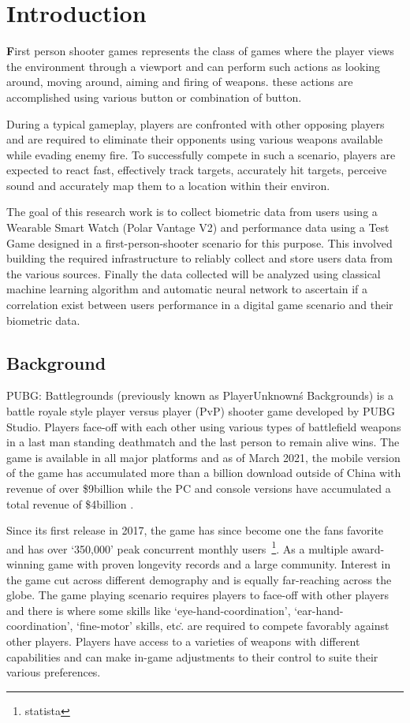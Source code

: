 \chapter{Introduction}

\textbf{F}irst person shooter games represents the class of games where the  player views the environment through a viewport
and can perform such actions as looking around, moving around, aiming and firing of weapons. these actions are accomplished
using various button or combination of button.

During a typical gameplay, players are confronted with other opposing players and are required to eliminate their opponents
using various weapons available while evading enemy fire. To successfully compete in such a scenario, players are expected to
react fast, effectively track targets, accurately hit targets, perceive sound and accurately map them to a location within
their environ.

The goal of this research work is to collect biometric data from users using a Wearable Smart Watch (Polar Vantage V2)
and performance data using a Test Game designed in a first-person-shooter scenario for this purpose. This involved building
the required infrastructure to reliably collect and store users data from the various sources. Finally the data collected will be
analyzed using classical machine learning algorithm and automatic neural network to ascertain if a correlation exist between
users performance in a digital game scenario and their biometric data.


\section{Background}
PUBG: Battlegrounds (previously known as PlayerUnknown\'s Backgrounds) is a battle royale style player versus
player (PvP) shooter game developed by PUBG Studio. Players face-off with each other using various types of battlefield weapons
in a last man standing deathmatch and the last person to remain alive wins. The game is available in all major platforms
and as of March 2021, the mobile version of the game has accumulated more than a billion download outside of China with
revenue of over \$9billion while the PC and console versions have accumulated a total revenue of \$4billion
\cite{statista}.
\par
Since its first release in 2017, the game has since become one the fans favorite and has over `350,000' peak concurrent
monthly users~\footnote{statista}. As a multiple award-winning game with proven longevity records and a large community.
Interest in the game cut across different demography and is equally far-reaching across the globe.
The game playing scenario requires players to face-off with other players and there is where some skills like
`eye-hand-coordination', `ear-hand-coordination', `fine-motor' skills, etc\.. are required to compete favorably against
other players. Players have access to a varieties of weapons with different capabilities and can make in-game adjustments
to their control to suite their various preferences.

